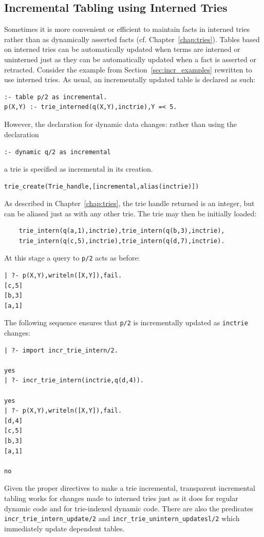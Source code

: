 \subsection{Incremental Tabling using Interned Tries} \label{sec:incr-update-tries}
%
Sometimes it is more convenient or efficient to maintain facts in
interned tries rather than as dynamically asserted facts
(cf. Chapter~\ref{chap:tries}).  Tables based on interned tries can be
automatically updated when terms are interned or uninterned just as
they can be automatically updated when a fact is asserted or
retracted.  Consider the example from Section~\ref{sec:incr_examples}
rewritten to use interned tries.  As usual, an incrementally updated
table is declared as such:
%
\begin{verbatim}
:- table p/2 as incremental.
p(X,Y) :- trie_interned(q(X,Y),inctrie),Y =< 5.
\end{verbatim}
%
However, the declaration for dynamic data changes: rather than using
the declaration 
\begin{center}
{\tt :- dynamic q/2 as incremental}
\end{center}
a trie is specified as incremental in its creation.
%
\begin{center}
{\tt  trie\_create(Trie\_handle,[incremental,alias(inctrie)])}
\end{center}
%
As described in Chapter~\ref{chap:tries}, the trie handle returned is
an integer, but can be aliased just as with any other trie.  The trie
may then be initially loaded:
%
\begin{verbatim}
	trie_intern(q(a,1),inctrie),trie_intern(q(b,3),inctrie),
	trie_intern(q(c,5),inctrie),trie_intern(q(d,7),inctrie).
\end{verbatim}
%
At this stage a query to {\tt p/2} acts as before:
%
\begin{verbatim}
| ?- p(X,Y),writeln([X,Y]),fail.
[c,5]
[b,3]
[a,1]
\end{verbatim}
%
The following sequence ensures that {\tt p/2} is incrementally updated
as {\tt inctrie} changes:
%
\begin{verbatim}
| ?- import incr_trie_intern/2.

yes
| ?- incr_trie_intern(inctrie,q(d,4)).

yes
| ?- p(X,Y),writeln([X,Y]),fail.
[d,4]
[c,5]
[b,3]
[a,1]

no
\end{verbatim}
%
Given the proper directives to make a trie incremental, transparent
incremental tabling works for changes made to interned tries just as
it does for regular dynamic code and for trie-indexed dynamic code.
There are also the predicates {\tt incr\_trie\_intern\_update/2} and
{\tt incr\_trie\_unintern\_updatesl/2} which immediately update
dependent tables.

